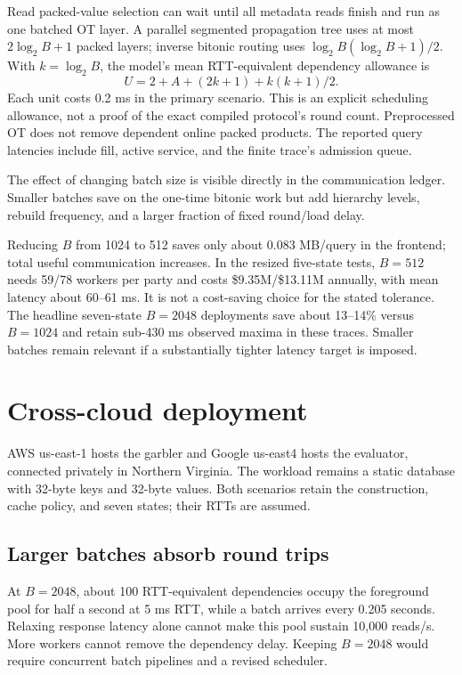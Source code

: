 \documentclass[11pt]{article}
\begin{document}
Read packed-value selection can wait until all metadata reads finish and
run as one batched OT layer. A parallel segmented propagation tree uses
at most $2\log_2B+1$ packed layers; inverse bitonic routing uses
$\log_2B(\log_2B+1)/2$. With $k=\log_2B$, the model's mean
RTT-equivalent dependency allowance is
\[
 U=2+A+(2k+1)+k(k+1)/2.
\]
Each unit costs 0.2 ms in the primary scenario. This is an explicit
scheduling allowance, not a proof of the exact compiled protocol's round
count. Preprocessed OT does not remove dependent online packed products.
The reported query latencies include fill, active service, and the finite
trace's admission queue.


The effect of changing batch size is visible directly in the communication
ledger. Smaller batches save on the one-time bitonic work but add hierarchy
levels, rebuild frequency, and a larger fraction of fixed round/load delay.


Reducing $B$ from 1024 to 512 saves only about 0.083 MB/query in the frontend;
total useful communication increases. In the resized five-state tests,
$B=512$ needs 59/78 workers per party and costs \$9.35M/\$13.11M annually,
with mean latency about 60--61 ms. It is not a cost-saving choice for the
stated tolerance. The headline seven-state $B=2048$ deployments save about
13--14\% versus $B=1024$ and retain sub-430 ms observed maxima in these
traces. Smaller batches remain relevant if a substantially tighter latency
target is imposed.

\clearpage
\section{Cross-cloud deployment}\label{sec:cross-cloud}

AWS us-east-1 hosts the garbler and Google us-east4 hosts the evaluator,
connected privately in Northern Virginia. The workload remains a static
database with 32-byte keys and 32-byte values. Both scenarios retain the
construction, cache policy, and seven states; their RTTs are assumed.


\subsection{Larger batches absorb round trips}
At $B=2048$, about 100 RTT-equivalent dependencies occupy the foreground
pool for half a second at 5 ms RTT, while a batch arrives every 0.205 seconds.
Relaxing response latency alone cannot make this pool sustain 10,000 reads/s.
More workers cannot remove the dependency delay. Keeping $B=2048$ would
require concurrent batch pipelines and a revised scheduler.
\end{document}
